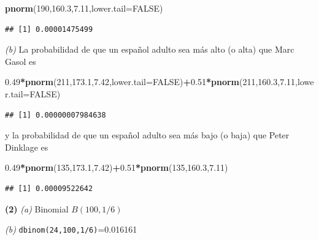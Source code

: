 \documentclass[]{book}
\newenvironment{Shaded}{\begin{snugshade}}{\end{snugshade}}
\newcommand{\DataTypeTok}[1]{\textcolor[rgb]{0.13,0.29,0.53}{#1}}
\newcommand{\DecValTok}[1]{\textcolor[rgb]{0.00,0.00,0.81}{#1}}
\newcommand{\FloatTok}[1]{\textcolor[rgb]{0.00,0.00,0.81}{#1}}
\newcommand{\KeywordTok}[1]{\textcolor[rgb]{0.13,0.29,0.53}{\textbf{#1}}}
\newcommand{\NormalTok}[1]{#1}
\newcommand{\OperatorTok}[1]{\textcolor[rgb]{0.81,0.36,0.00}{\textbf{#1}}}
\newcommand{\OtherTok}[1]{\textcolor[rgb]{0.56,0.35,0.01}{#1}}
\theoremstyle{definition}
\theoremstyle{definition}
\theoremstyle{definition}
\theoremstyle{remark}
\begin{document}
\begin{Shaded}
\begin{Highlighting}[]
\KeywordTok{pnorm}\NormalTok{(}\DecValTok{190}\NormalTok{,}\FloatTok{160.3}\NormalTok{,}\FloatTok{7.11}\NormalTok{,}\DataTypeTok{lower.tail=}\OtherTok{FALSE}\NormalTok{)}
\end{Highlighting}
\end{Shaded}

\begin{verbatim}
## [1] 0.00001475499
\end{verbatim}

\emph{(b)} La probabilidad de que un español adulto sea más alto (o alta) que Marc Gasol es

\begin{Shaded}
\begin{Highlighting}[]
\FloatTok{0.49}\OperatorTok{*}\KeywordTok{pnorm}\NormalTok{(}\DecValTok{211}\NormalTok{,}\FloatTok{173.1}\NormalTok{,}\FloatTok{7.42}\NormalTok{,}\DataTypeTok{lower.tail=}\OtherTok{FALSE}\NormalTok{)}\OperatorTok{+}\FloatTok{0.51}\OperatorTok{*}\KeywordTok{pnorm}\NormalTok{(}\DecValTok{211}\NormalTok{,}\FloatTok{160.3}\NormalTok{,}\FloatTok{7.11}\NormalTok{,}\DataTypeTok{lower.tail=}\OtherTok{FALSE}\NormalTok{)}
\end{Highlighting}
\end{Shaded}

\begin{verbatim}
## [1] 0.00000007984638
\end{verbatim}

y la probabilidad de que un español adulto sea más bajo (o baja) que Peter Dinklage es

\begin{Shaded}
\begin{Highlighting}[]
\FloatTok{0.49}\OperatorTok{*}\KeywordTok{pnorm}\NormalTok{(}\DecValTok{135}\NormalTok{,}\FloatTok{173.1}\NormalTok{,}\FloatTok{7.42}\NormalTok{)}\OperatorTok{+}\FloatTok{0.51}\OperatorTok{*}\KeywordTok{pnorm}\NormalTok{(}\DecValTok{135}\NormalTok{,}\FloatTok{160.3}\NormalTok{,}\FloatTok{7.11}\NormalTok{)}
\end{Highlighting}
\end{Shaded}

\begin{verbatim}
## [1] 0.00009522642
\end{verbatim}

\textbf{(2)} \emph{(a)} Binomial \(B(100,1/6)\)

\emph{(b)} \texttt{dbinom(24,100,1/6)}=0.016161
\end{document}
